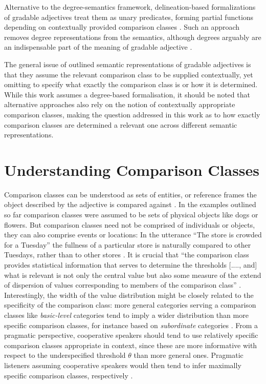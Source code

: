 Alternative to the degree-semantics framework, delineation-based formalizations of gradable adjectives treat them as unary predicates, forming partial functions depending on contextually provided comparison classes \parencite{Klein1980}. Such an approach removes degree representations from the semantics, although degrees arguably are an indispensable part of the meaning of gradable adjective \parencite{Solt2009}. 

The general issue of outlined semantic representations of gradable adjectives is that they assume the relevant comparison class to be supplied contextually, yet omitting to specify what exactly the comparison class is or how it is determined. 
While this work assumes a degree-based formalisation, it should be noted that alternative approaches also rely on the notion of contextually appropriate comparison classes, making the question addressed in this work as to how exactly comparison classes are determined a relevant one across different semantic representations.

\section{Understanding Comparison Classes}
\label{2.2.}
Comparison classes can be understood as sets of entities, or reference frames the object described by the adjective is compared against \parencite{Bierwisch1989, Solt2009, Klein1980}. In the examples outlined so far comparison classes were assumed to be sets of physical objects like dogs or flowers. But comparison classes need not be comprised of individuals or objects, they can also comprise events or locations: In the utterance “The store is crowded for a Tuesday” the fullness of a particular store is naturally compared to other Tuesdays, rather than to other stores \parencite{Solt2009}. It is crucial that “the comparison class provides statistical information that serves to determine the thresholds [...., and] what is relevant is not only the central value but also some measure of the extend of dispersion of values corresponding to members of the comparison class” \parencite[p.193]{Solt2009}.  Interestingly, the width of the value distribution might be closely related to the specificity of the comparison class: more general categories serving a comparison classes like \textit{basic-level} categories tend to imply a wider distribution than more specific comparison classes, for instance based on \textit{subordinate} categories \parencite{rosch1976}. From a pragmatic perspective, cooperative speakers should tend to use relatively specific comparison classes appropriate in context, since these are more informative with respect to the underspecified threshold $\theta$ than more general ones. Pragmatic listeners assuming cooperative speakers would then tend to infer maximally specific comparison classes, respectively \parencite{tessler2017warm}. 

